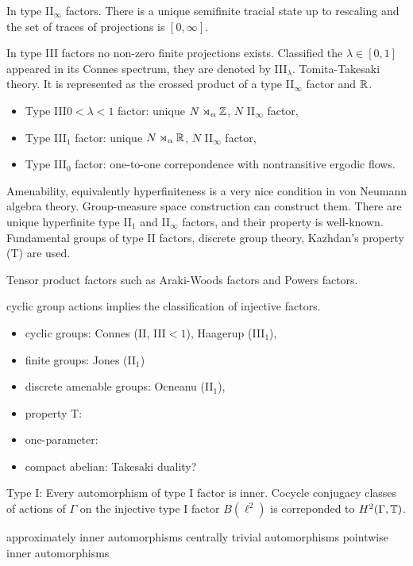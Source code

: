 \documentclass{../../large}
\begin{document}
In type II$_\infty$ factors.
There is a unique semifinite tracial state up to rescaling and the set of traces of projections is $[0,\infty]$.

In type III factors no non-zero finite projections exists.
Classified the $\lambda\in[0,1]$ appeared in its Connes spectrum, they are denoted by III$_\lambda$.
Tomita-Takesaki theory.
It is represented as the crossed product of a type II$_\infty$ factor and $\mathbb{R}$.

\begin{itemize}
\item Type III$0<\lambda<1$ factor: unique $N\rtimes_\alpha\mathbb{Z}$, $N$ II$_\infty$ factor,
\item Type III$_1$ factor: unique $N\rtimes_\alpha\mathbb{R}$, $N$ II$_\infty$ factor,
\item Type III$_0$ factor: one-to-one correpondence with nontransitive ergodic flows.
\end{itemize}

Amenability, equivalently hyperfiniteness is a very nice condition in von Neumann algebra theory.
Group-measure space construction can construct them.
There are unique hyperfinite type II$_1$ and II$_\infty$ factors, and their property is well-known.
Fundamental groups of type II factors, discrete group theory, Kazhdan's property (T) are used.

Tensor product factors such as Araki-Woods factors and Powers factors.








cyclic group actions implies the classification of injective factors.

\begin{itemize}
\item cyclic groups: Connes (II, III$<1$), Haagerup (III$_1$),
\item finite groups: Jones (II$_1$)
\item discrete amenable groups: Ocneanu (II$_1$), 
\item property T:
\item one-parameter:
\item compact abelian: Takesaki duality?
\end{itemize}

Type I:
Every automorphism of type I factor is inner.
Cocycle conjugacy classes of actions of $\Gamma$ on the injective type I factor $B(\ell^2)$ is correponded to $H^2(\Gamma,\mathbb{T})$.

approximately inner automorphisms
centrally trivial automorphisms
pointwise inner automorphisms
\end{document}
